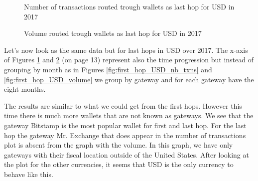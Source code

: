 \begin{figure}[h!]
  \caption{Number of transactions routed trough wallets as last hop for USD in 2017}
  \label{fig:last_hop_USD_nb_txns}
\end{figure}

\begin{figure}[h!]
  \caption{Volume routed trough wallets as last hop for USD in 2017}
  \label{fig:last_hop_USD_volume}
\end{figure}
Let's now look as the same data but for last hops in USD over 2017. The x-axis of Figures \ref{fig:last_hop_USD_nb_txns} and \ref{fig:last_hop_USD_volume} (on page 13) represent also the time progression but instead of grouping by month as in Figures \ref{fig:first_hop_USD_nb_txns} and \ref{fig:first_hop_USD_volume} we group by gateway and for each gateway have the eight months. 

The results are similar to what we could get from the first hops. However this time there is much more wallets that are not known as gateways. We see that the gateway Bitstamp is the most popular wallet for first and last hop. For the last hop the gateway Mr. Exchange that does appear in the number of transactions plot is absent from the graph with the volume. In this graph, we have only gateways with their fiscal location outside of the United States. After looking at the plot for the other currencies, it seems that USD is the only currency to behave like this.
\vspace{\baselineskip}

